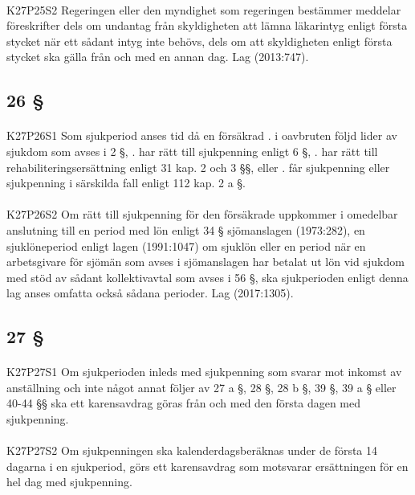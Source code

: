 \documentclass[a4paper,notitlepage,openany,10pt]{book}
\begin{document}
\paragraph*{}
{\tiny K27P25S2}
Regeringen eller den myndighet som regeringen bestämmer meddelar föreskrifter dels om undantag från skyldigheten att lämna läkarintyg enligt första stycket när ett sådant intyg inte behövs, dels om att skyldigheten enligt första stycket ska gälla från och med en annan dag.
Lag (2013:747).
\subsection*{26 §}
\paragraph*{}
{\tiny K27P26S1}
Som sjukperiod anses tid då en försäkrad
. i oavbruten följd lider av sjukdom som avses i 2 §,
. har rätt till sjukpenning enligt 6 §,
. har rätt till rehabiliteringsersättning enligt 31 kap. 2 och 3 §§, eller
. får sjukpenning eller sjukpenning i särskilda fall enligt 112 kap. 2 a §.
\paragraph*{}
{\tiny K27P26S2}
Om rätt till sjukpenning för den försäkrade uppkommer i omedelbar anslutning till en period med lön enligt 34 § sjömanslagen (1973:282), en sjuklöneperiod enligt lagen (1991:1047) om sjuklön eller en period när en arbetsgivare för sjömän som avses i sjömanslagen har betalat ut lön vid sjukdom med stöd av sådant kollektivavtal som avses i 56 §, ska sjukperioden enligt denna lag anses omfatta också sådana perioder.
Lag (2017:1305).
\subsection*{27 §}
\paragraph*{}
{\tiny K27P27S1}
Om sjukperioden inleds med sjukpenning som svarar mot inkomst av anställning och inte något annat följer av 27 a §, 28 §, 28 b §, 39 §, 39 a § eller 40-44 §§ ska ett karensavdrag göras från och med den första dagen med sjukpenning.
\paragraph*{}
{\tiny K27P27S2}
Om sjukpenningen ska kalenderdagsberäknas under de första 14 dagarna i en sjukperiod, görs ett karensavdrag som motsvarar ersättningen för en hel dag med sjukpenning.
\end{document}
